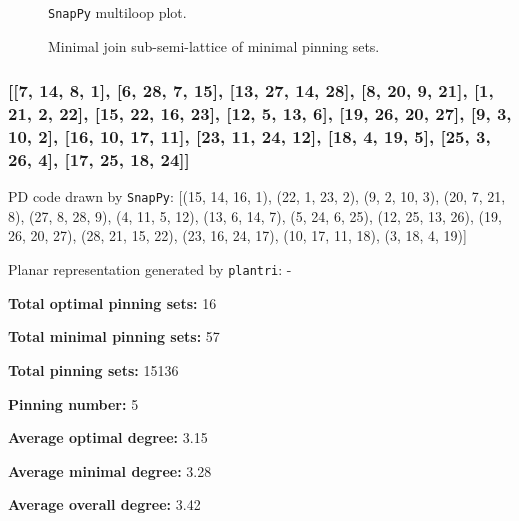 \documentclass{article}%
\begin{document}
\begin{multicols}{2}
\begin{figure}[H]
\centering

\caption{\texttt{SnapPy} multiloop plot.}
\label{fig:tex/img/[[12, 7, 1, 8], [8, 13, 9, 24], [11, 15, 12, 16], [6, 14, 7, 15], [1, 14, 2, 13], [9, 18, 10, 17], [23, 16, 24, 17], [10, 22, 11, 23], [5, 28, 6, 25], [2, 19, 3, 18], [21, 25, 22, 26], [4, 20, 5, 21],.svg}
\end{figure}
\columnbreak

\begin{figure}[H]
\centering
\scalebox{0.8}{}
\caption{Minimal join sub-semi-lattice of minimal pinning sets.}
\label{fig:tex/img/[[12, 7, 1, 8], [8, 13, 9, 24], [11, 15, 12, 16], [6, 14, 7, 15], [1, 14, 2, 13], [9, 18, 10, 17], [23, 16, 24, 17], [10, 22, 11, 23], [5, 28, 6, 25], [2, 19, 3, 18], [21, 25, 22, 26], [4, 20, 5, 21],.pgf}
\end{figure}
\end{multicols}

\newpage

\subsubsection{[[7, 14, 8, 1], [6, 28, 7, 15], [13, 27, 14, 28], [8, 20, 9, 21], [1, 21, 2, 22], [15, 22, 16, 23], [12, 5, 13, 6], [19, 26, 20, 27], [9, 3, 10, 2], [16, 10, 17, 11], [23, 11, 24, 12], [18, 4, 19, 5], [25, 3, 26, 4], [17, 25, 18, 24]]}

{\small\noindent PD code drawn by \texttt{SnapPy}: [(15, 14, 16, 1), (22, 1, 23, 2), (9, 2, 10, 3), (20, 7, 21, 8), (27, 8, 28, 9), (4, 11, 5, 12), (13, 6, 14, 7), (5, 24, 6, 25), (12, 25, 13, 26), (19, 26, 20, 27), (28, 21, 15, 22), (23, 16, 24, 17), (10, 17, 11, 18), (3, 18, 4, 19)]}

{\small\noindent Planar representation generated by \texttt{plantri}: -}

\begin{multicols}{2}
{\normalsize \noindent\textbf{Total optimal pinning sets:} 16

\noindent\textbf{Total minimal pinning sets:} 57

\noindent\textbf{Total pinning sets:} 15136

\noindent\textbf{Pinning number:} 5

}
\columnbreak

{\normalsize \noindent\textbf{Average optimal degree:} 3.15

\noindent\textbf{Average minimal degree:} 3.28

\noindent\textbf{Average overall degree:} 3.42

}
\end{multicols}
\end{document}
